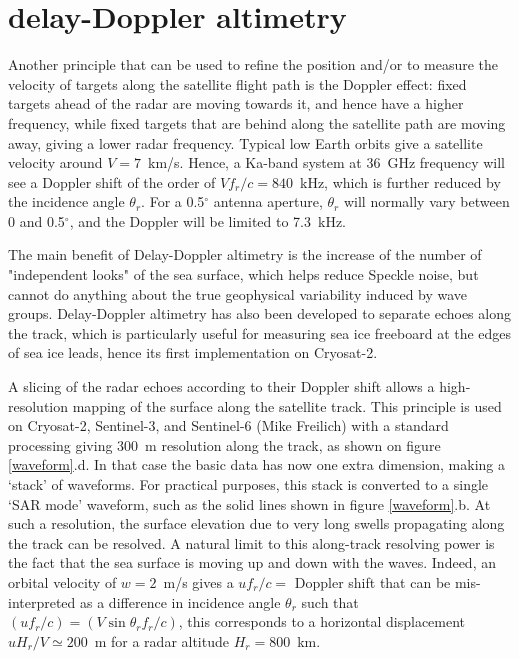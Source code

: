 \section{delay-Doppler altimetry}\label{section:delay-Doppler}
Another principle that can be used to refine the position and/or to measure the velocity of targets along the satellite flight path is the Doppler effect: fixed targets ahead of the radar are moving towards it, and hence have a higher frequency, while fixed targets that are behind along the satellite path 
are moving away, giving a lower radar frequency. Typical low Earth orbits give a satellite velocity around $V=7$~km/s. Hence, a Ka-band system at 36~GHz frequency will see a Doppler shift
of the order of $V f_r/c = 840$~kHz, which is further reduced by the incidence angle $\theta_r$. For a 0.5$^\circ$  antenna aperture, $\theta_r$ will 
normally vary between 0 and 0.5$^\circ$,  and the Doppler will be limited to 7.3~kHz.  

The main benefit of Delay-Doppler altimetry is the increase of the number of "independent looks" of the sea surface, which helps reduce Speckle noise, but cannot do anything about the true geophysical variability induced by wave groups. Delay-Doppler altimetry has also been developed to separate echoes along the track, which is particularly useful for measuring sea ice freeboard at the edges of sea ice leads, hence its first implementation on Cryosat-2. 


A slicing of the radar echoes according to their Doppler shift allows a high-resolution mapping of the surface along the satellite track. 
This principle is used on  Cryosat-2, Sentinel-3, and Sentinel-6 (Mike Freilich) with a standard processing giving 300~m resolution along the track, as shown on figure \ref{waveform}.d. In that case the basic 
data has now one extra dimension, making a `stack' of waveforms. For practical purposes, this stack is converted to a single `SAR mode' waveform, such as the solid lines 
shown in figure \ref{waveform}.b. 
At such a  resolution, the surface elevation due to  very long swells propagating along the track can be resolved. 
A natural limit to this along-track resolving power is the fact that the sea surface is moving up and down with the waves. Indeed, an orbital velocity 
of $w=2$~m/s gives a $u f_r / c=$ Doppler shift that can be mis-interpreted as a difference in incidence angle $\theta_r$ such that  
$(u f_r / c)=(V \sin\theta_r  f_r/c)$, this corresponds to a horizontal displacement $u H_r/V \simeq 200$~m for a radar altitude 
$H_r = 800$~km. 


